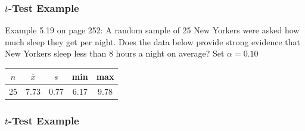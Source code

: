 \documentclass[handout]{beamer}
\newcommand{\blue}[1]{\textcolor{blue2}{#1}}
\newcommand{\xbar}{\overline{x}}
\begin{document}
\begin{frame}
\frametitle{$t$-Test Example}

Example 5.19 on page 252:  A random sample of 25 New Yorkers were asked how much sleep they get per night. Does the data below provide strong evidence that New Yorkers sleep less than 8 hours a night on average?  Set $\alpha=0.10$

\vspace{0.5cm}
\begin{center}
\begin{tabular}{c|c|c|c|c}
$n$ & $\xbar$ & $s$ & min & max\\
\hline
25 & 7.73 & 0.77 & 6.17 & 9.78\\
\end{tabular}
\end{center}

\end{frame}


\begin{frame}
\frametitle{$t$-Test Example}
%
%
%
%
\end{frame}
\end{document}
